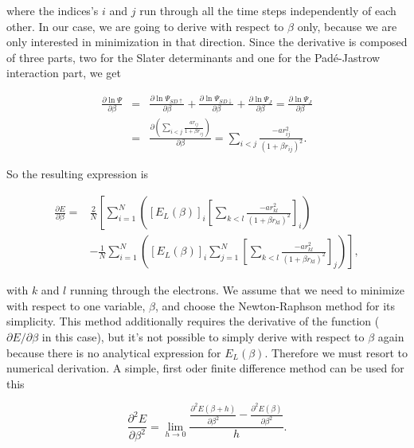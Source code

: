 		where the indices's $i$ and $j$ run through all the time steps independently of each other. In our case, we are going to derive with respect to $\beta$ only, because we are only interested in minimization in that direction. Since the derivative is composed of three parts, two for the Slater determinants and one for the Padé-Jastrow interaction part, we get

		\begin{eqnarray*}
		\frac{\partial\ln{\Psi}}{\partial\beta} & = & \frac{\partial\ln{\Psi_{SD\uparrow}}}{\partial\beta}+\frac{\partial\ln{\Psi_{SD\downarrow}}}{\partial\beta}+\frac{\partial\ln{\Psi_J}}{\partial\beta}=\frac{\partial\ln{\Psi_J}}{\partial\beta}\\ 
		& = & \frac{\partial\left(\sum_{i<j}\frac{ar_{ij}}{1+\beta r_{ij}}\right)}{\partial\beta} = \sum_{i<j}\frac{-ar_{ij}^2}{\left(1+\beta r_{ij}\right)^2}.
		\end{eqnarray*}

		So the resulting expression is

		\begin{equation}
		\begin{split}
		\frac{\partial E}{\partial\beta}= & \frac{2}{N}\left[\sum_{i=1}^N\left(\left[E_L\left(\beta\right)\right]_i\left[\sum_{k<l}\frac{-ar_{kl}^2}{\left(1+\beta r_{kl}\right)^2}\right]_i\right) \right.\\ 
		& \left. - \frac{1}{N}\sum_{i=1}^N\left(\left[E_L\left(\beta\right)\right]_i\sum_{j=1}^N\left[\sum_{k<l}\frac{-ar_{kl}^2}{\left(1+\beta r_{kl}\right)^2}\right]_j\right)\right],
		\end{split}
		\end{equation}

		with $k$ and $l$ running through the electrons. We assume that we need to minimize with respect to one variable, $\beta$, and choose the Newton-Raphson method for its simplicity. This method additionally requires the derivative of the function ($\partial E/\partial\beta$ in this case), but it's not possible to simply derive with respect to $\beta$ again because there is no analytical expression for $E_L\left(\beta\right)$. Therefore we must resort to numerical derivation. A simple, first oder finite difference method can be used for this

		\begin{equation}
		\frac{\partial^2 E}{\partial\beta^2}=\lim_{h\to 0}\frac{\frac{\partial^2 E\left(\beta+h\right)}{\partial\beta^2}-\frac{\partial^2 E\left(\beta\right)}{\partial\beta^2}}{h}.
		\end{equation}

